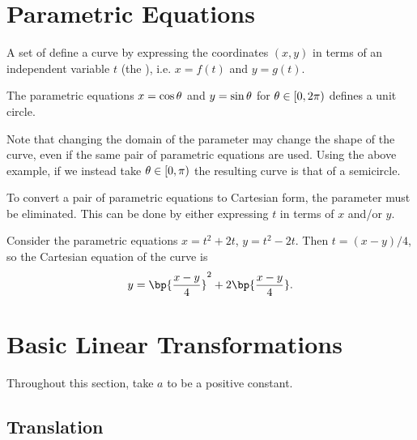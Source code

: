 \section{Parametric Equations}

\begin{definition}
    A set of  define a curve by expressing the coordinates $(x, y)$ in terms of an independent variable $t$ (the ), i.e. $x = f(t)$ and $y = g(t)$.
\end{definition}

\begin{example}
    The parametric equations $x = \cos \theta$ and $y = \sin \theta$ for $\theta \in [0, 2\pi)$ defines a unit circle.
\end{example}

Note that changing the domain of the parameter may change the shape of the curve, even if the same pair of parametric equations are used. Using the above example, if we instead take $\theta \in [0, \pi)$ the resulting curve is that of a semicircle.

To convert a pair of parametric equations to Cartesian form, the parameter must be eliminated. This can be done by either expressing $t$ in terms of $x$ and/or $y$.

\begin{example}
    Consider the parametric equations $x = t^2 + 2t$, $y = t^2 - 2t$. Then $t = (x-y)/4$, so the Cartesian equation of the curve is \[y = \bp{\frac{x-y}4}^2 + 2\bp{\frac{x-y}4}.\]
\end{example}

\section{Basic Linear Transformations}

Throughout this section, take $a$ to be a positive constant.

\subsection{Translation}

